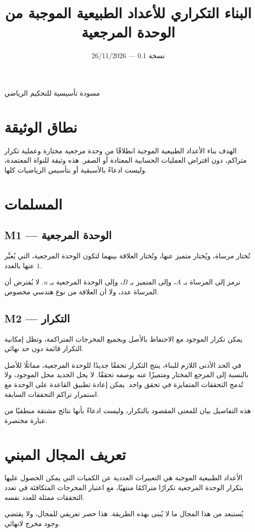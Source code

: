 \documentclass[12pt,a4paper]{article}
\title{البناء التكراري للأعداد الطبيعية الموجبة من الوحدة المرجعية}
\author{}
\date{\textenglish{26/11/2026} — نسخة \textenglish{0.1}}
\begin{document}
\maketitle
\begin{center}
مسودة تأسيسية للتحكيم الرياضي
\end{center}
\section{نطاق الوثيقة}
الهدف بناء الأعداد الطبيعية الموجبة انطلاقًا من وحدة مرجعية مختارة وعملية تكرار متراكم، دون افتراض العمليات الحسابية المعتادة أو الصفر. هذه وثيقة للنواة المعتمدة، وليست ادعاءً بالأسبقية أو بتأسيس الرياضيات كلها.
\section{المسلمات}
\subsection*{\textenglish{M1} — الوحدة المرجعية}
تُختار مرساة، ويُختار متميز عنها، وتُختار العلاقة بينهما لتكون الوحدة المرجعية، التي يُعبَّر عنها بالعدد \(1\).

نرمز إلى المرساة بـ \(A\)، وإلى المتميز بـ \(B\)، وإلى الوحدة المرجعية بـ \(u\). لا يُفترض أن المرساة عدد، ولا أن العلاقة من نوع هندسي مخصوص.
\subsection*{\textenglish{M2} — التكرار}
يمكن تكرار الموجود مع الاحتفاظ بالأصل وبجميع المخرجات المتراكمة، وتظل إمكانية التكرار قائمة دون حد نهائي.

في الحد الأدنى اللازم للبناء، ينتج التكرار تحققًا جديدًا للوحدة المرجعية، مماثلًا للأصل بالنسبة إلى المرجع المختار ومتميزًا عنه بوصفه تحققًا. لا يحل الجديد محل الموجود، ولا تُدمج التحققات المتمايزة في تحقق واحد. يمكن إعادة تطبيق القاعدة على الوحدة مع استمرار تراكم التحققات السابقة.

هذه التفاصيل بيان للمعنى المقصود بالتكرار، وليست ادعاءً بأنها نتائج مشتقة منطقيًا من عبارة مختصرة.
\section{تعريف المجال المبني}
الأعداد الطبيعية الموجبة هي التعبيرات العددية عن الكميات التي يمكن الحصول عليها بتكرار الوحدة المرجعية تكرارًا متراكمًا منتهيًا، مع اعتبار المخرجات المتكافئة في تعدد التحققات ممثلة للعدد نفسه.

يُستبعد من هذا المجال ما لا يُبنى بهذه الطريقة. هذا حصر تعريفي للمجال، ولا يقتضي وجود مخرج لانهائي.
\end{document}
